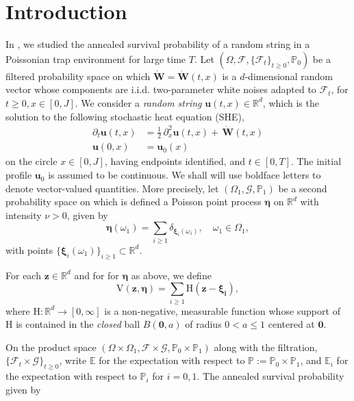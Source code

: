 \documentclass[12pt]{amsart}
\numberwithin{equation}{section}
\theoremstyle{definition}
\numberwithin{equation}{section}
\newcommand{\mP}{\mathbb{P}}
\newcommand{\mt}{\boldsymbol{\eta}}
\newcommand{\R}{\mathbb{R}}
\newcommand{\V}{\text{V}}
\newcommand{\HH}{\text{H}}
\newcommand{\E}{\mathbb{E}}
\newcommand{\e}{\boldsymbol{\eta}}
\newcommand{\mf}{\mathbf}
\begin{document}
\section{Introduction}


In \cite{ajm23}, we studied the annealed survival probability of a random 
string in a Poissonian trap environment for large time $T$.  Let 
$(\Omega, {\mathcal F}, \{{\mathcal F}_t\}_{t \geq 0}, \mP_0)$ be a 
filtered probability space on which $\dot{\mf W}=\dot{\mf W}(t,x)$ is a 
$d$-dimensional random vector whose components are i.i.d. two-parameter 
white noises adapted to ${\mathcal F}_t$, for $t\ge0,x\in[0,J]$. We consider a {\it random string} 
$\mf u(t,x)\in\R^d$, which is the solution to the following 
stochastic heat equation (SHE),
\begin{equation}
\label{eq:she}
\begin{split}
\partial_t {\mf u} (t,x) &=\frac{1}{2}\,\partial_x^2{\mf u}(t,x) + \,\dot {\mf  W}
(t,x)  \\
\mf u(0,x)&=\mf u_0(x)
\end{split}
\end{equation}
on the circle $x\in [0,J]$, having endpoints identified, and $t \in [0,T].$ 
The initial profile $\mf u_0$ is assumed to be continuous.  We shall 
will use boldface letters to denote vector-valued quantities.  More precisely, let $(\Omega_1,\mathcal{G},\mP_1)$ be a second
probability space on which is defined a Poisson point process {$\mt$} on 
$\R^d$ with intensity $\nu>0$, given by 
 \begin{equation*}
\mt(\omega_1) = \sum_{i\geq 1}\delta_{ \boldsymbol{\xi}_i(\omega_1)},\quad 
       \omega_1\in\Omega_1,
\end{equation*}
with points $\{\boldsymbol{\xi}_i(\omega_1)\}_{i\ge 1}\subset \R^d$. 

For each $\mathbf{z}\in\R^d$ and for for $\mathbb{\e}$ as above, we define
$$ \V(\mathbf{z},\e) = \sum_{i \geq 1} \HH(\mathbf{z}-\boldsymbol{\xi_i}),$$
where $\HH: \R^d \rightarrow [0,\infty]$ is a non-negative, measurable function whose support of $\HH$  is contained in the {\it closed} ball $B(\mathbf 0,a)$ of radius $0<a\le 1$ centered at $\mathbf 0$.

On the product space
$ (\Omega\times\Omega_1,
\mathcal{F}\times\mathcal{G},\mP_0\times\mP_1)$ along with the filtration,$\{\mathcal{F}_t\times \mathcal{G}\}_{t\ge0}$, write $\E$ for the expectation with respect to
$\mP:=\mP_0\times\mP_1$,
and $\E_i$ for the expectation with respect to $\mP_i$ for $i=0,1$. The annealed survival probability given by
\end{document}
